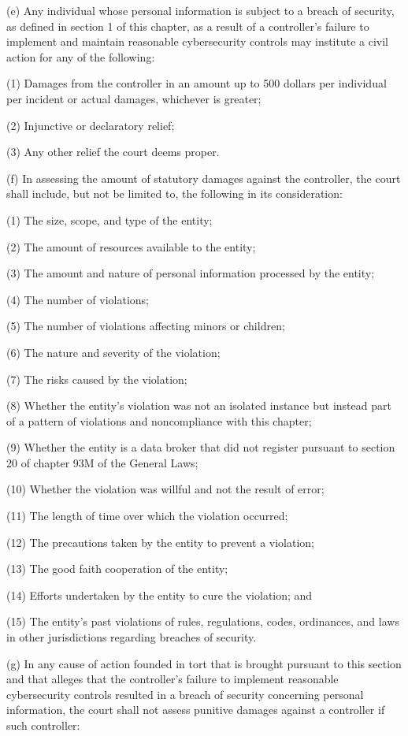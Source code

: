 (e) Any individual whose personal information is subject to a breach of security, as defined in section 1 of this chapter, as a result of a controller’s failure to implement and maintain reasonable cybersecurity controls may institute a civil action for any of the following:

(1) Damages from the controller in an amount up to 500 dollars per individual per incident or actual damages, whichever is greater;

(2) Injunctive or declaratory relief;

(3) Any other relief the court deems proper.

(f) In assessing the amount of statutory damages against the controller, the court shall include, but not be limited to, the following in its consideration:

(1) The size, scope, and type of the entity;

(2) The amount of resources available to the entity;

(3) The amount and nature of personal information processed by the entity;

(4) The number of violations;

(5) The number of violations affecting minors or children; 

(6) The nature and severity of the violation; 

(7) The risks caused by the violation;

(8) Whether the entity’s violation was not an isolated instance but instead part of a pattern of violations and noncompliance with this chapter;

(9) Whether the entity is a data broker that did not register pursuant to section 20 of chapter 93M of the General Laws;

(10) Whether the violation was willful and not the result of error;

(11) The length of time over which the violation occurred; 

(12) The precautions taken by the entity to prevent a violation;

(13) The good faith cooperation of the entity;

(14) Efforts undertaken by the entity to cure the violation; and    

(15) The entity’s past violations of rules, regulations, codes, ordinances, and laws in other jurisdictions regarding breaches of security.

(g) In any cause of action founded in tort that is brought pursuant to this section and that alleges that the controller’s failure to implement reasonable cybersecurity controls resulted in a breach of security concerning personal information, the court shall not assess punitive damages against a controller if such controller:

